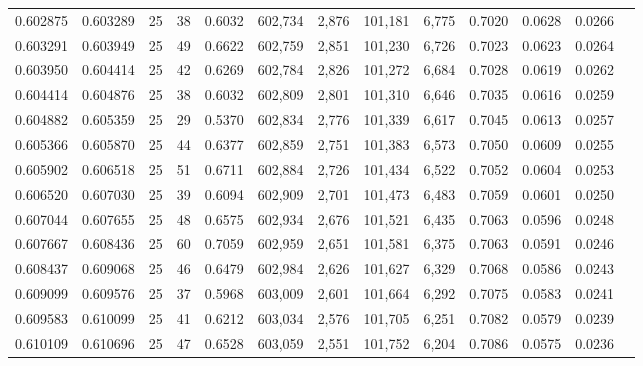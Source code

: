 \begin{tabular}{rrrrrrrrrrrrr}
0.602875 & 0.603289 &    25 &  38 &                                     0.6032 & 602,734 &   2,876 & 101,181 &   6,775 & 0.7020 & 0.0628 & 0.0266 \\
0.603291 & 0.603949 &    25 &  49 &                                     0.6622 & 602,759 &   2,851 & 101,230 &   6,726 & 0.7023 & 0.0623 & 0.0264 \\
0.603950 & 0.604414 &    25 &  42 &                                     0.6269 & 602,784 &   2,826 & 101,272 &   6,684 & 0.7028 & 0.0619 & 0.0262 \\
0.604414 & 0.604876 &    25 &  38 &                                     0.6032 & 602,809 &   2,801 & 101,310 &   6,646 & 0.7035 & 0.0616 & 0.0259 \\
0.604882 & 0.605359 &    25 &  29 &                                     0.5370 & 602,834 &   2,776 & 101,339 &   6,617 & 0.7045 & 0.0613 & 0.0257 \\
0.605366 & 0.605870 &    25 &  44 &                                     0.6377 & 602,859 &   2,751 & 101,383 &   6,573 & 0.7050 & 0.0609 & 0.0255 \\
0.605902 & 0.606518 &    25 &  51 &                                     0.6711 & 602,884 &   2,726 & 101,434 &   6,522 & 0.7052 & 0.0604 & 0.0253 \\
0.606520 & 0.607030 &    25 &  39 &                                     0.6094 & 602,909 &   2,701 & 101,473 &   6,483 & 0.7059 & 0.0601 & 0.0250 \\
0.607044 & 0.607655 &    25 &  48 &                                     0.6575 & 602,934 &   2,676 & 101,521 &   6,435 & 0.7063 & 0.0596 & 0.0248 \\
0.607667 & 0.608436 &    25 &  60 &                                     0.7059 & 602,959 &   2,651 & 101,581 &   6,375 & 0.7063 & 0.0591 & 0.0246 \\
0.608437 & 0.609068 &    25 &  46 &                                     0.6479 & 602,984 &   2,626 & 101,627 &   6,329 & 0.7068 & 0.0586 & 0.0243 \\
0.609099 & 0.609576 &    25 &  37 &                                     0.5968 & 603,009 &   2,601 & 101,664 &   6,292 & 0.7075 & 0.0583 & 0.0241 \\
0.609583 & 0.610099 &    25 &  41 &                                     0.6212 & 603,034 &   2,576 & 101,705 &   6,251 & 0.7082 & 0.0579 & 0.0239 \\
0.610109 & 0.610696 &    25 &  47 &                                     0.6528 & 603,059 &   2,551 & 101,752 &   6,204 & 0.7086 & 0.0575 & 0.0236 \\

\end{tabular}
